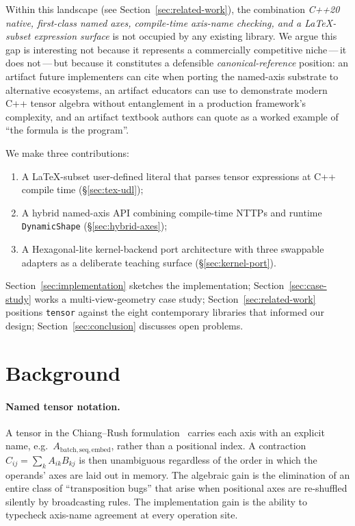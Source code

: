 \documentclass[11pt,a4paper]{article}
\begin{document}
Within this landscape (see Section~\ref{sec:related-work}), the
combination \emph{C++20 native, first-class named axes,
compile-time axis-name checking, and a \LaTeX-subset
expression surface} is not occupied by any existing library. We
argue this gap is interesting not because it represents a
commercially competitive niche\,---\,it does not\,---\,but
because it constitutes a defensible \emph{canonical-reference}
position: an artifact future implementers can cite when porting
the named-axis substrate to alternative ecosystems, an artifact
educators can use to demonstrate modern C++ tensor algebra
without entanglement in a production framework's complexity, and
an artifact textbook authors can quote as a worked example of
``the formula is the program''.

We make three contributions:
\begin{enumerate}
\item A \LaTeX-subset user-defined literal that parses tensor
expressions at C++ compile time
(\S\ref{sec:tex-udl});
\item A hybrid named-axis API combining compile-time NTTPs and
runtime \texttt{DynamicShape}
(\S\ref{sec:hybrid-axes});
\item A Hexagonal-lite kernel-backend port architecture with
three swappable adapters as a deliberate teaching surface
(\S\ref{sec:kernel-port}).
\end{enumerate}

Section~\ref{sec:implementation} sketches the implementation;
Section~\ref{sec:case-study} works a multi-view-geometry case
study; Section~\ref{sec:related-work} positions
\texttt{tensor} against the eight contemporary libraries that
informed our design;
Section~\ref{sec:conclusion} discusses open problems.

\section{Background}
\label{sec:background}

\paragraph{Named tensor notation.} A tensor in the Chiang--Rush
formulation~\cite{ChiangRush2021} carries each axis with an
explicit name, e.g.\ $A_{\textrm{batch},\textrm{seq},\textrm{embed}}$,
rather than a positional index. A contraction
$C_{ij} = \sum_k A_{ik} B_{kj}$ is then unambiguous regardless of
the order in which the operands' axes are laid out in memory. The
algebraic gain is the elimination of an entire class of
``transposition bugs'' that arise when positional axes are
re-shuffled silently by broadcasting rules. The implementation
gain is the ability to typecheck axis-name agreement at every
operation site.
\end{document}
